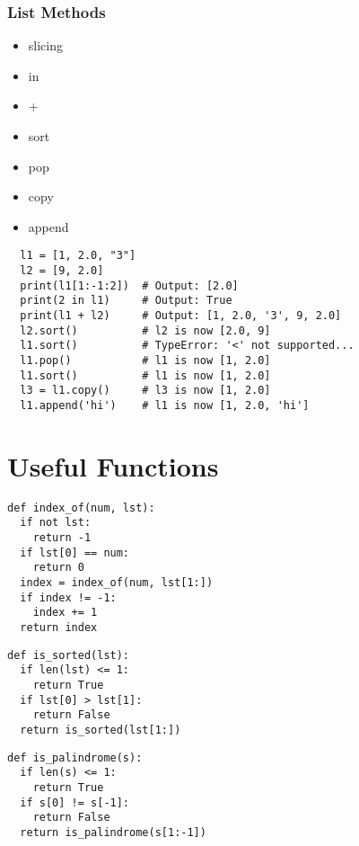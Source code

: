 \documentclass[11pt]{article}
\begin{document}
\begin{multicols}{2}
\subsubsection{List Methods}
\vspace{-0.6cm}
\begin{multicols}{4}
  \begin{itemize}
      \item slicing
      \item in
      \item +
      \item sort
      \item pop
      \item copy
      \item append
  \end{itemize}
\end{multicols}
\vspace{-0.4cm}
\begin{lstlisting}
  l1 = [1, 2.0, "3"]
  l2 = [9, 2.0]
  print(l1[1:-1:2])  # Output: [2.0]
  print(2 in l1)     # Output: True
  print(l1 + l2)     # Output: [1, 2.0, '3', 9, 2.0]
  l2.sort()          # l2 is now [2.0, 9]
  l1.sort()          # TypeError: '<' not supported...
  l1.pop()           # l1 is now [1, 2.0]
  l1.sort()          # l1 is now [1, 2.0]
  l3 = l1.copy()     # l3 is now [1, 2.0]
  l1.append('hi')    # l1 is now [1, 2.0, 'hi']
\end{lstlisting}

\pagebreak

\section{Useful Functions}

\begin{multicols}{2}
\begin{lstlisting}
def index_of(num, lst):
  if not lst:
    return -1
  if lst[0] == num:
    return 0
  index = index_of(num, lst[1:])
  if index != -1:
    index += 1
  return index
\end{lstlisting}

\begin{lstlisting}
def is_sorted(lst):
  if len(lst) <= 1:
    return True
  if lst[0] > lst[1]:
    return False
  return is_sorted(lst[1:])
\end{lstlisting}

\begin{lstlisting}
def is_palindrome(s):
  if len(s) <= 1:
    return True
  if s[0] != s[-1]:
    return False
  return is_palindrome(s[1:-1])
\end{lstlisting}


\end{multicols}
\end{multicols}
\end{document}
